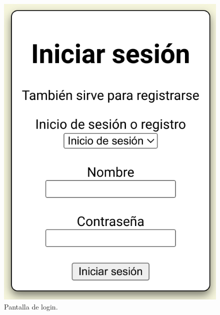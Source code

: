 \documentclass{article}
\begin{document}
\begin{figure}[H]
    \centering
    \begin{minipage}[H]{0.49\textwidth}
        \centering
        \includegraphics[width=\textwidth]{images/login.png}
        \caption{Pantalla de login.}
    \end{minipage}
    \hfill
    \begin{minipage}[H]{0.49\textwidth}
        \centering

\end{minipage}
\end{figure}
\end{document}
